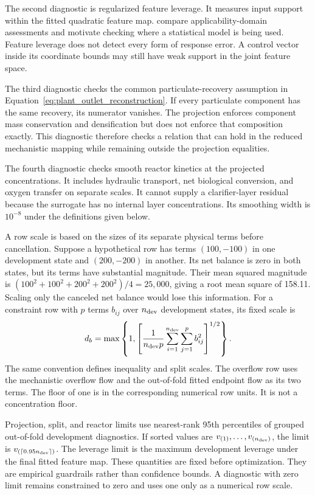 The second diagnostic is regularized feature leverage. It measures input support within the fitted quadratic feature map. \citet{Sahigara2012} compare applicability-domain assessments and motivate checking where a statistical model is being used. Feature leverage does not detect every form of response error. A control vector inside its coordinate bounds may still have weak support in the joint feature space.

The third diagnostic checks the common particulate-recovery assumption in Equation~\eqref{eq:plant_outlet_reconstruction}. If every particulate component has the same recovery, its numerator vanishes. The projection enforces component mass conservation and densification but does not enforce that composition exactly. This diagnostic therefore checks a relation that can hold in the reduced mechanistic mapping while remaining outside the projection equalities.

The fourth diagnostic checks smooth reactor kinetics at the projected concentrations. It includes hydraulic transport, net biological conversion, and oxygen transfer on separate scales. It cannot supply a clarifier-layer residual because the surrogate has no internal layer concentrations. Its smoothing width is $10^{-8}$ under the definitions given below.

A row scale is based on the sizes of its separate physical terms before cancellation. Suppose a hypothetical row has terms $(100,-100)$ in one development state and $(200,-200)$ in another. Its net balance is zero in both states, but its terms have substantial magnitude. Their mean squared magnitude is $(100^2+100^2+200^2+200^2)/4=25{,}000$, giving a root mean square of 158.11. Scaling only the canceled net balance would lose this information. For a constraint row with $p$ terms $b_{ij}$ over $n_{\rm dev}$ development states, its fixed scale is
\begin{equation}
\equationname{Term-based scale for an independently checked residual}
d_b=\max\left\{1,\left[\frac1{n_{\rm dev}p}
\sum_{i=1}^{n_{\rm dev}}\sum_{j=1}^{p}b_{ij}^2\right]^{1/2}\right\}.
\label{eq:plant_term_scales}
\end{equation}
The same convention defines inequality and split scales. The overflow row uses the mechanistic overflow flow and the out-of-fold fitted endpoint flow as its two terms. The floor of one is in the corresponding numerical row units. It is not a concentration floor.

Projection, split, and reactor limits use nearest-rank 95th percentiles of grouped out-of-fold development diagnostics. If sorted values are $v_{(1)},\ldots,v_{(n_{\rm dev})}$, the limit is $v_{(\lceil0.95n_{\rm dev}\rceil)}$. The leverage limit is the maximum development leverage under the final fitted feature map. These quantities are fixed before optimization. They are empirical guardrails rather than confidence bounds. A diagnostic with zero limit remains constrained to zero and uses one only as a numerical row scale.

